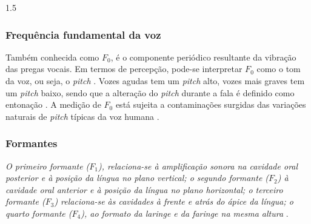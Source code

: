 \documentclass[a4paper,12pt,openright,oneside]{book}
\newenvironment{myenv}[1]
{\begin{spacing}{#1}}
	{\end{spacing}}
\begin{document}
\begin{myenv}{1.5}
\subsubsection{Frequência fundamental da voz}
\par Também conhecida como $F_0$, é o componente periódico resultante da vibração das pregas vocais. Em termos de percepção, pode-se interpretar $F_0$ como o tom da voz, ou seja, o \textit{pitch} \cite{kremer2014eficiencia}. Vozes agudas tem um \textit{pitch} alto, vozes mais graves tem um \textit{pitch} baixo, sendo que a alteração do \textit{pitch} durante a fala é definido como entonação \cite{freitas2013avaliaccao}. A medição de $F_0$ está sujeita a contaminações surgidas das variações naturais de \textit{pitch} típicas da voz humana \cite{freitas2013avaliaccao}. 
\subsubsection{Formantes}
\par \textit{O primeiro formante ($F_1$), relaciona-se à  amplificação  sonora  na  cavidade  oral  posterior  e  à  posição  da  língua  no  plano  vertical;  o segundo  formante  ($F_2$)  à  cavidade  oral  anterior  e  à  posição  da  língua  no  plano  horizontal; o terceiro  formante  ($F_3$)  relaciona-se  às  cavidades  à  frente  e  atrás  do  ápice  da  língua;  o  quarto formante  ($F_4$),  ao  formato  da  laringe  e  da  faringe  na  mesma  altura} \cite{valencca2014analise}.







\end{myenv}
\end{document}
